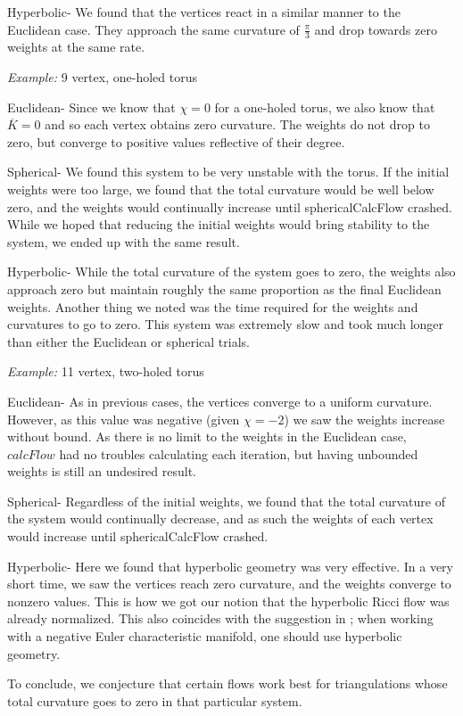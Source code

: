 \documentclass[12pt]{article}
\begin{document}
 Hyperbolic- We found that the vertices react in a similar manner to the Euclidean case. They approach the same curvature of $\frac{\pi}{3}$ and drop towards zero weights at the same rate. 

 \textit{Example:} 9 vertex, one-holed torus

 Euclidean- Since we know that $\chi = 0$ for a one-holed torus, we also know that $\overline{K} = 0$ and so each vertex obtains zero curvature. The weights do not drop to zero, but converge to positive values reflective of their degree. 

 Spherical- We found this system to be very unstable with the torus. If the initial weights were too large, we found that the total curvature would be well below zero, and the weights would continually increase until sphericalCalcFlow crashed. While we hoped that reducing the initial weights would bring stability to the system, we ended up with the same result.

 Hyperbolic- While the total curvature of the system goes to zero, the weights also approach zero but maintain roughly the same proportion as the final Euclidean weights. Another thing we noted was the time required for the weights and curvatures to go to zero. This system was extremely slow and took much longer than either the Euclidean or spherical trials. 

 \textit{Example:} 11 vertex, two-holed torus

 Euclidean- As in previous cases, the vertices converge to a uniform curvature. However, as this value was negative (given $\chi = -2$) we saw the weights increase without bound. As there is no limit to the weights in the Euclidean case, $calcFlow$ had no troubles calculating each iteration, but having unbounded weights is still an undesired result. 

 Spherical- Regardless of the initial weights, we found that the total curvature of the system would continually decrease, and as such the weights of each vertex would increase until sphericalCalcFlow crashed. 

 Hyperbolic- Here we found that hyperbolic geometry was very effective. In a very short time, we saw the vertices reach zero curvature, and the weights converge to nonzero values. This is how we got our notion that the hyperbolic Ricci flow was already normalized. This also coincides with the suggestion in \cite{chowluo}; when working with a negative Euler characteristic manifold, one should use hyperbolic geometry.

 To conclude, we conjecture that certain flows work best for triangulations whose total curvature goes to zero in that particular system. 
\end{document}
